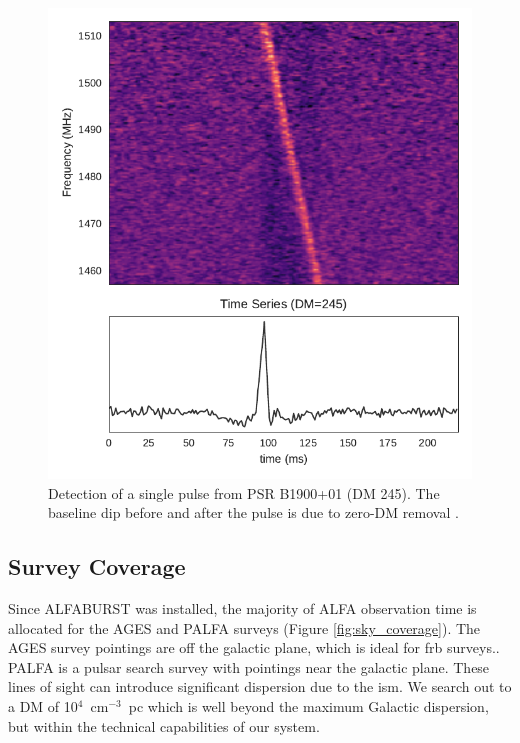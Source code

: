 \documentclass[a4paper,fleqn,usenatbib]{mnras}
\begin{document}
\begin{figure}
    \includegraphics[width=1.0\linewidth]{figures/B1900_01.pdf}
    \caption{Detection of a single pulse from PSR B1900+01 (DM 245). The
    baseline dip before and after the pulse is due to zero-DM removal
    \citep{2009MNRAS.395..410E}. }
    \label{fig:B1900}
\end{figure}



\subsection{Survey Coverage}
\label{sec:survey_coverage}

Since ALFABURST was installed, the majority of ALFA observation time is
allocated for the AGES \citep{2006MNRAS.371.1617A} and PALFA
\citep{2006ApJ...637..446C} surveys (Figure \ref{fig:sky_coverage}).  The AGES
survey pointings are off the galactic plane, which is ideal for \gls{frb}
surveys.. PALFA is a pulsar search survey with pointings near the galactic
plane. These lines of sight can introduce significant dispersion due to the
\gls{ism}. We search out to a DM of 10$^{4}$~cm$^{-3}$~pc which is well beyond
the maximum Galactic dispersion, but within the technical capabilities of our
system. 
\end{document}
